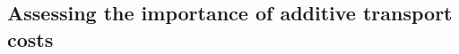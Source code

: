 \documentclass[a4paper,11pt]{article}
\begin{document}


\subsection{Assessing the importance of additive transport costs}
\end{document}
